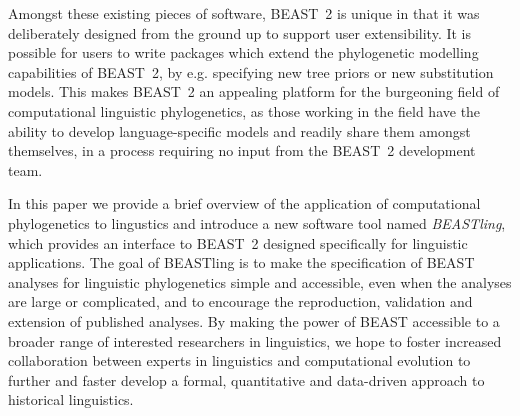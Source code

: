 \documentclass[10pt,a4paper]{article}
\begin{document}
Amongst these existing pieces of software, BEAST~2 is unique in that it was deliberately designed from the ground up to support user extensibility.  It is possible for users to write packages which extend the phylogenetic modelling capabilities of BEAST~2, by e.g. specifying new tree priors or new substitution models.  This makes BEAST~2 an appealing platform for the burgeoning field of computational linguistic phylogenetics, as those working in the field have the ability to develop language-specific models and readily share them amongst themselves, in a process requiring no input from the BEAST~2 development team.

In this paper we provide a brief overview of the application of computational phylogenetics to lingustics and introduce a new software tool named \mbox{\emph{BEASTling}}, which provides an interface to BEAST~2 designed specifically for linguistic applications.  The goal of BEASTling is to make the specification of BEAST analyses for linguistic phylogenetics simple and accessible, even when the analyses are large or complicated, and to encourage the reproduction, validation and extension of published analyses.  By making the power of BEAST accessible to a broader range of interested researchers in linguistics, we hope to foster increased collaboration between experts in linguistics and computational evolution to further and faster develop a formal, quantitative and data-driven approach to historical linguistics.

\end{document}
